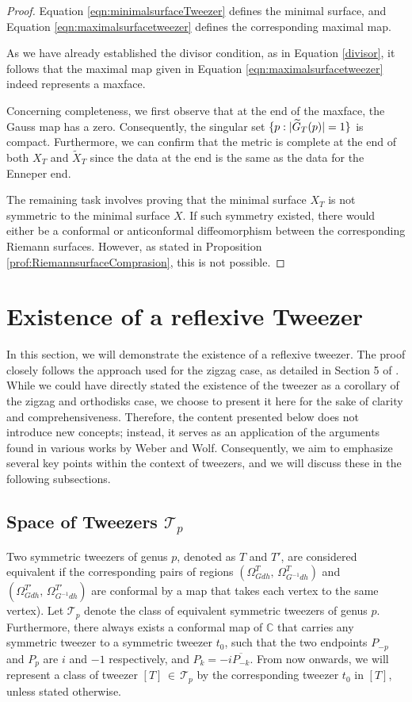 \documentclass[12pt,epsfig,tikz,multi]{amsart}
\numberwithin{equation}{section}
\begin{document}
\begin{proof}
Equation \eqref{eqn:minimalsurfaceTweezer} defines the minimal surface, and Equation \eqref{eqn:maximalsurfacetweezer} defines the corresponding maximal map.

As we have already established the divisor condition, as in Equation \eqref{divisor}, it follows that the maximal map given in Equation \eqref{eqn:maximalsurfacetweezer} indeed represents a maxface.

Concerning completeness, we first observe that at the end of the maxface, the Gauss map has a zero. Consequently, the singular set  $\{p\color{black}: |\widetilde{G}_T(p\color{black})|=1\}$ is compact. Furthermore, we can confirm that the metric is complete at the end of both $X_T$ and $\widetilde{X}_T$ since the data at the end is the same as the data for the Enneper end.


The remaining task involves proving that the minimal surface $X_T$ is not symmetric to the minimal surface $X$. If such symmetry existed, there would either be a conformal or anticonformal diffeomorphism between the corresponding Riemann surfaces. However, as stated in Proposition \ref{prof:RiemannsurfaceComprasion}, this is not possible.
\end{proof}

\section{\textbf{Existence of a reflexive Tweezer}}

In this section, we will demonstrate the existence of a reflexive tweezer. The proof closely follows the 
approach used for the zigzag case, as detailed in Section 5 of \cite{weber1998minimal}. While we could have 
directly stated the existence of the tweezer as a corollary of the zigzag and orthodisks case, we choose to 
present it here for the sake of clarity and comprehensiveness.
Therefore, the content presented below does not introduce new concepts; instead, it serves as an application of the arguments found in various works by Weber and Wolf. Consequently, we aim to emphasize several key points within the context of tweezers, and we will discuss these in the following subsections.

\subsection{Space of Tweezers $\mathcal{T}_p$}

Two symmetric tweezers of genus $p$, denoted as $T$ and $T'$, are considered equivalent if the corresponding pairs 
of regions $(\Omega^T_{Gdh},\, \Omega^T_{G^{-1}dh})$ and $(\Omega^{T'}_{Gdh},\, 
\Omega^{T'}_{G^{-1}dh})$ are conformal by a map that takes each vertex to the same vertex).
Let $\mathcal{T}_p$ denote the class of equivalent symmetric tweezers of genus $p$. Furthermore, there always 
exists a conformal map of $\mathbb{C}$ that carries any symmetric tweezer to a symmetric tweezer $t_0$, such that 
the two endpoints $P_{-p}$ and $P_p$ are $i$ and $-1$ respectively, and $P_{k}=-i\overline{P_{-k}}$. From now 
onwards, we will represent a class of tweezer $[T]\,\in\,\mathcal{T}_p$ by the corresponding tweezer $t_0$ in $[T]$, 
unless stated otherwise.
\end{document}
